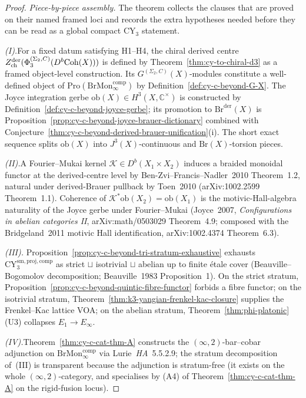 \begin{proof}
\textit{Piece-by-piece assembly.} The theorem collects the clauses that
are proved on their named framed loci and records the extra hypotheses
needed before they can be read as a global compact CY$_3$ statement.

\textit{(I).}\enspace For a fixed datum satisfying H1--H4, the chiral derived centre
$Z^{\mathrm{der}}_{\mathrm{ch}}(\Phi_3^{(\Sigma_2,C)}(D^b\mathrm{Coh}(X)))$ is defined by
Theorem~\ref{thm:cy-to-chiral-d3} as a framed object-level construction. Its
$G^{(\Sigma_2,C)}(X)$-modules
constitute a well-defined object of
$\mathrm{Pro}(\mathrm{BrMon}^{\mathrm{comp}}_\infty)$ by
Definition~\ref{def:cy-c-beyond-G-X}. The Joyce integration gerbe
$\mathrm{ob}(X) \in H^3(X, \mathbb C^\times)$ is constructed by
Definition~\ref{def:cy-c-beyond-joyce-gerbe}; its promotion to
$\mathrm{Br}^{\mathrm{der}}(X)$ is
Proposition~\ref{prop:cy-c-beyond-joyce-brauer-dictionary} combined
with
Conjecture~\ref{thm:cy-c-beyond-derived-brauer-unification}\textup{(i)}.
The short exact sequence splits $\mathrm{ob}(X)$ into
$J^3(X)$-continuous and $\mathrm{Br}(X)$-torsion pieces.

\textit{(II).}\enspace A Fourier--Mukai kernel
$\mathcal K \in D^b(X_1 \times X_2)$ induces a braided monoidal
functor at the derived-centre level by Ben-Zvi--Francis--Nadler~2010
Theorem~1.2, natural under derived-Brauer pullback by Toen~2010
(arXiv:1002.2599 Theorem~1.1). Coherence of
$\mathcal K^* \mathrm{ob}(X_2) = \mathrm{ob}(X_1)$ is the
motivic-Hall-algebra naturality of the Joyce gerbe under Fourier--Mukai
(Joyce~2007, \emph{Configurations in abelian categories II},
arXiv:math/0503029 Theorem~4.9; composed with the Bridgeland~2011
motivic Hall identification, arXiv:1002.4374 Theorem~6.3).

\textit{(III).}\enspace
Proposition~\ref{prop:cy-c-beyond-tri-stratum-exhaustive} exhausts
$\mathrm{CY}_3^{\mathrm{sm,proj,comp}}$ as strict $\sqcup$ isotrivial
$\sqcup$ abelian up to finite \'etale cover
(Beauville--Bogomolov decomposition; Beauville~1983 Proposition~1). On
the strict stratum,
Proposition~\ref{prop:cy-c-beyond-quintic-fibre-functor} forbids a
fibre functor; on the isotrivial stratum,
Theorem~\ref{thm:k3-yangian-frenkel-kac-closure} supplies the
Frenkel--Kac lattice VOA; on the abelian stratum,
Theorem~\ref{thm:phi-platonic}\textup{(U3)} collapses
$E_1 \to E_\infty$.

\textit{(IV).}\enspace Theorem~\ref{thm:cy-c-cat-thm-A} constructs the
$(\infty,2)$-bar--cobar adjunction on
$\mathrm{BrMon}^{\mathrm{comp}}_\infty$ via Lurie~\emph{HA}~5.5.2.9;
the stratum decomposition of~(III) is transparent because the
adjunction is stratum-free (it exists on the whole
$(\infty,2)$-category, and specialises by (A4) of
Theorem~\ref{thm:cy-c-cat-thm-A} on the rigid-fusion locus).


\end{proof}
